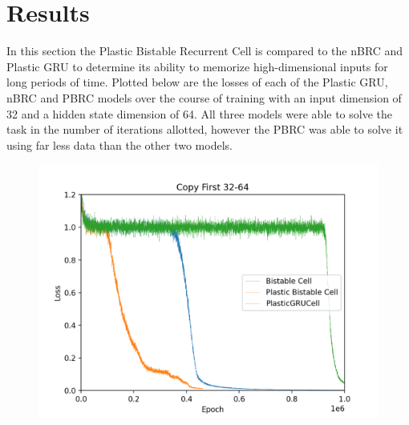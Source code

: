 \section{Results}

In this section the Plastic Bistable Recurrent Cell is compared to the nBRC and Plastic GRU to determine its ability to memorize high-dimensional inputs for long periods of time. Plotted below are the losses of each of the Plastic GRU, nBRC and PBRC models over the course of training with an input dimension of 32 and a hidden state dimension of 64. All three models were able to solve the task in the number of iterations allotted, however the PBRC was able to solve it using far less data than the other two models.

\begin{figure}[h]
	\centering
	\includegraphics[width=6in]{plots/32_64_plot}
\end{figure}